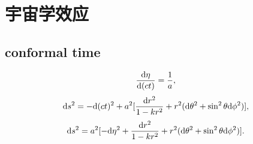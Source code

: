 \chapter{宇宙学效应}

\section{conformal time}

\begin{equation}
    \frac{\mathrm{d}\eta}{\mathrm{d}(ct)}=\frac{1}{a},
\end{equation}
\begin{equation}
    \mathrm{d} s^2=-\mathrm{d}(ct)^2+a^2[\frac{\mathrm{d} r^2}{1-kr^2}+r^2(\mathrm{d}\theta^2+\sin^2\theta\mathrm{d}\phi^2)],
\end{equation}
\begin{equation}
    \mathrm{d} s^2=a^2[-\mathrm{d}\eta^2+\frac{\mathrm{d} r^2}{1-kr^2}+r^2(\mathrm{d}\theta^2+\sin^2\theta\mathrm{d}\phi^2)].
\end{equation}
